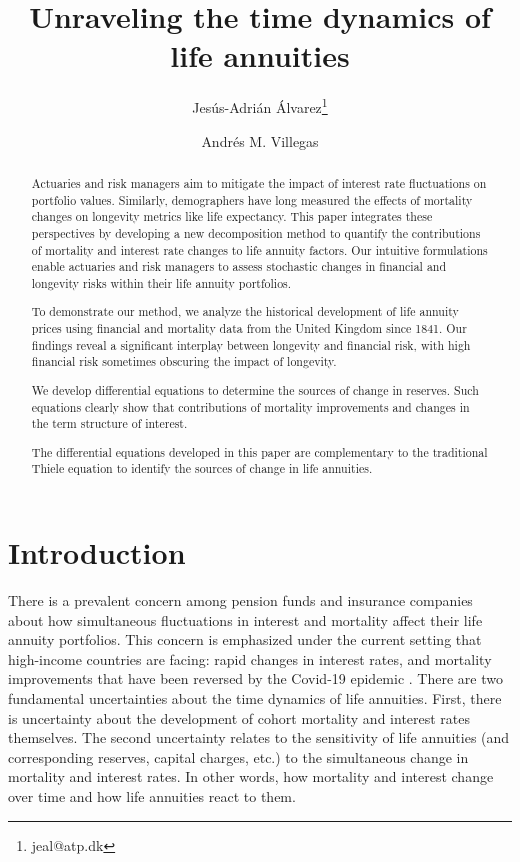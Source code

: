 \documentclass[12pt]{article}
\title{Unraveling the time dynamics of life annuities}
\author[1]{Jes\'us-Adri\'an \'Alvarez\thanks{jeal@atp.dk}}
\author[2]{Andr\'es M. Villegas}
\affil[1]{{\small Danish Labour Market Supplementary Pension Fund (ATP), Kongens V\ae nge 8, 3400 Hiller\o d, Denmark} }
\affil[2]{\small{School of Risk and Actuarial Studies and ARC Centre of Excellence in Population Ageing Research (CEPAR)\\ UNSW Business School, Sydney, Australia}}
\begin{document}
\maketitle

{
\setcounter{tocdepth}{2}
}



\begin{abstract}
	
	Actuaries and risk managers aim to mitigate the impact of interest rate fluctuations on portfolio values. Similarly, demographers have long measured the effects of mortality changes on longevity metrics like life expectancy. This paper integrates these perspectives by developing a new decomposition method to quantify the contributions of mortality and interest rate changes to life annuity factors. Our intuitive formulations enable actuaries and risk managers to assess stochastic changes in financial and longevity risks within their life annuity portfolios.
	
	To demonstrate our method, we analyze the historical development of life annuity prices using financial and mortality data from the United Kingdom since 1841. Our findings reveal a significant interplay between longevity and financial risk, with high financial risk sometimes obscuring the impact of longevity.
	
	We develop differential equations to determine the sources of change in reserves. Such equations clearly show that contributions of mortality improvements and changes in the term structure of interest.
	
	The differential equations developed in this paper are complementary to the traditional Thiele equation to identify the sources of change in life annuities.
	
	
\end{abstract}
\newpage
\section{Introduction}\label{sec:1_introduction}

There is a prevalent concern among pension funds and insurance companies about how simultaneous fluctuations in interest and mortality affect their life annuity portfolios. This concern is emphasized under the current setting that high-income countries are facing: rapid changes in interest rates, and mortality improvements \citep{djeundje2022slowdown} that have been reversed by the Covid-19 epidemic \citep{aburto2022quantifying}. There are two fundamental uncertainties about the time dynamics of life annuities. First, there is uncertainty about the development of cohort mortality and interest rates themselves. The second uncertainty relates to the sensitivity of life annuities (and corresponding reserves, capital charges, etc.) to the simultaneous change in mortality and interest rates. In other words, how mortality and interest change over time and how life annuities react to them.
\end{document}
